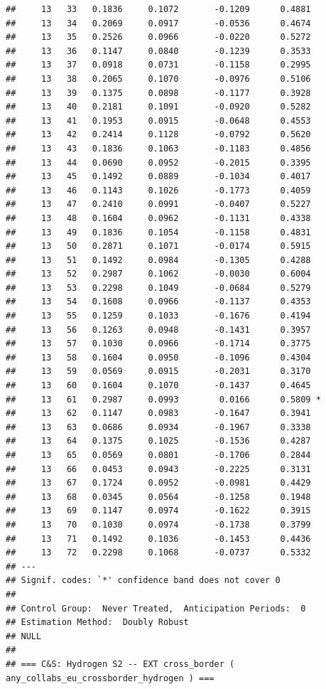 \documentclass[
]{article}
\begin{document}
\begin{verbatim}
##     13   33   0.1836     0.1072       -0.1209      0.4881  
##     13   34   0.2069     0.0917       -0.0536      0.4674  
##     13   35   0.2526     0.0966       -0.0220      0.5272  
##     13   36   0.1147     0.0840       -0.1239      0.3533  
##     13   37   0.0918     0.0731       -0.1158      0.2995  
##     13   38   0.2065     0.1070       -0.0976      0.5106  
##     13   39   0.1375     0.0898       -0.1177      0.3928  
##     13   40   0.2181     0.1091       -0.0920      0.5282  
##     13   41   0.1953     0.0915       -0.0648      0.4553  
##     13   42   0.2414     0.1128       -0.0792      0.5620  
##     13   43   0.1836     0.1063       -0.1183      0.4856  
##     13   44   0.0690     0.0952       -0.2015      0.3395  
##     13   45   0.1492     0.0889       -0.1034      0.4017  
##     13   46   0.1143     0.1026       -0.1773      0.4059  
##     13   47   0.2410     0.0991       -0.0407      0.5227  
##     13   48   0.1604     0.0962       -0.1131      0.4338  
##     13   49   0.1836     0.1054       -0.1158      0.4831  
##     13   50   0.2871     0.1071       -0.0174      0.5915  
##     13   51   0.1492     0.0984       -0.1305      0.4288  
##     13   52   0.2987     0.1062       -0.0030      0.6004  
##     13   53   0.2298     0.1049       -0.0684      0.5279  
##     13   54   0.1608     0.0966       -0.1137      0.4353  
##     13   55   0.1259     0.1033       -0.1676      0.4194  
##     13   56   0.1263     0.0948       -0.1431      0.3957  
##     13   57   0.1030     0.0966       -0.1714      0.3775  
##     13   58   0.1604     0.0950       -0.1096      0.4304  
##     13   59   0.0569     0.0915       -0.2031      0.3170  
##     13   60   0.1604     0.1070       -0.1437      0.4645  
##     13   61   0.2987     0.0993        0.0166      0.5809 *
##     13   62   0.1147     0.0983       -0.1647      0.3941  
##     13   63   0.0686     0.0934       -0.1967      0.3338  
##     13   64   0.1375     0.1025       -0.1536      0.4287  
##     13   65   0.0569     0.0801       -0.1706      0.2844  
##     13   66   0.0453     0.0943       -0.2225      0.3131  
##     13   67   0.1724     0.0952       -0.0981      0.4429  
##     13   68   0.0345     0.0564       -0.1258      0.1948  
##     13   69   0.1147     0.0974       -0.1622      0.3915  
##     13   70   0.1030     0.0974       -0.1738      0.3799  
##     13   71   0.1492     0.1036       -0.1453      0.4436  
##     13   72   0.2298     0.1068       -0.0737      0.5332  
## ---
## Signif. codes: `*' confidence band does not cover 0
## 
## Control Group:  Never Treated,  Anticipation Periods:  0
## Estimation Method:  Doubly Robust
## NULL
## 
## === C&S: Hydrogen S2 -- EXT cross_border ( any_collabs_eu_crossborder_hydrogen ) ===
\end{verbatim}
\end{document}
